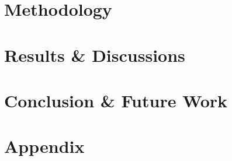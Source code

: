 \documentclass[%
]{tumDiss}
\begin{document}
% 

\chapter{Methodology}
\label{chap:methodology}


\chapter{Results \& Discussions}
\label{chap:results}



\chapter{Conclusion \& Future Work}
\label{chap:conclusion}



\backmatter




\appendix
\chapter{Appendix}



\end{document}
